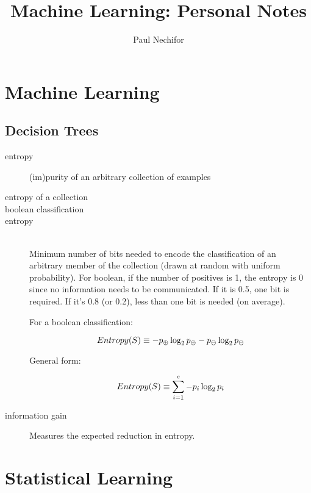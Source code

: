 \documentclass[12pt]{article}
\title{Machine Learning: Personal Notes}
\author{Paul Nechifor}
\newcommand{\hitem}[1][default] {
    \item[#1] \hfill \\
}
\begin{document}
\maketitle

\section{Machine Learning}

\subsection{Decision Trees}

\begin{description}

\item[entropy] (im)purity of an arbitrary collection of examples

\item[entropy of a collection]

\item[boolean classification]

\hitem[entropy]
Minimum number of bits needed to encode the classification of an arbitrary
member of the collection (drawn at random with uniform probability). For
boolean, if the number of positives is 1, the entropy is 0 since no information
needs to be communicated. If it is 0.5, one bit is required. If it's 0.8 (or
0.2), less than one bit is needed (on average).

For a boolean classification:

\begin{equation}
    Entropy(S) \equiv -p_\oplus \log_2 p_\oplus - p_\ominus \log_2 p_\ominus
    \notag
\end{equation}

General form:

\begin{equation}
    Entropy(S) \equiv \sum\limits_{i=1}^c -p_i \log_2 p_i
    \notag
\end{equation}

\item[information gain] Measures the expected reduction in entropy.

\end{description}


\section{Statistical Learning}
\end{document}
